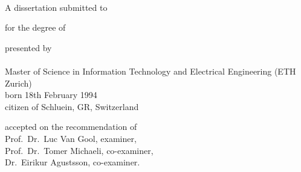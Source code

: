 \begin{titlepage}
    \begin{center}
        \large
        \begingroup
        \endgroup

        \hfill

        \vfill

        \begingroup
            \spacedallcaps{\myTitleOnTitlePageLineOne}\\
            \spacedallcaps{\myTitleOnTitlePageLineTwo}
        \endgroup

        \vfill

        \begingroup
            A dissertation submitted to\\
        \endgroup
        
        \vfill

        \begingroup
            for the degree of\\
        \endgroup

        \vfill

        \begingroup
            presented by\\
            \spacedlowsmallcaps{\myName}\\
            Master of Science in 
            Information Technology and 
            Electrical Engineering 
            (ETH Zurich)\\
            born 18th February 1994\\
            citizen of Schluein, GR, Switzerland
        \endgroup

        \vfill

        \begingroup
            accepted on the recommendation of\\
            Prof.\ Dr.\ Luc Van Gool, examiner,\\
            Prof.\ Dr.\ Tomer Michaeli, co-examiner,\\
            Dr.\ Eirikur Agustsson, co-examiner. \\
        \endgroup


        \vfill

        \myTime

        \vfill                      

    \end{center}  
\end{titlepage}   
